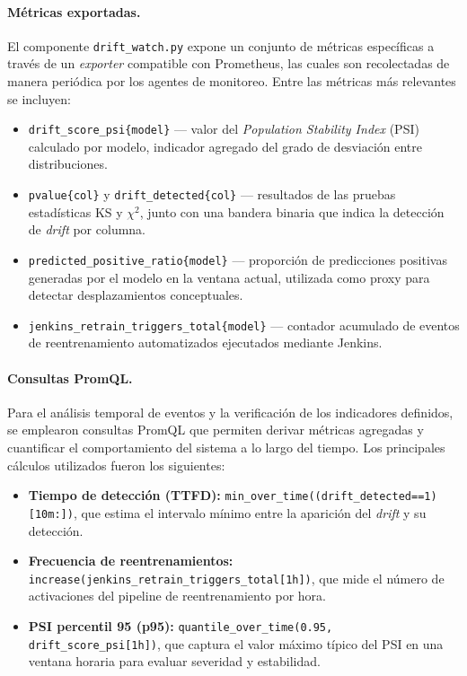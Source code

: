 \paragraph{Métricas exportadas.}
El componente \texttt{drift\_watch.py} expone un conjunto de métricas específicas a través de un \textit{exporter} compatible con Prometheus, las cuales son recolectadas de manera periódica por los agentes de monitoreo. Entre las métricas más relevantes se incluyen:
\begin{itemize}\setlength\itemsep{2pt}
  \item \texttt{drift\_score\_psi\{model\}} — valor del \textit{Population Stability Index} (PSI) calculado por modelo, indicador agregado del grado de desviación entre distribuciones.
  \item \texttt{pvalue\{col\}} y \texttt{drift\_detected\{col\}} — resultados de las pruebas estadísticas KS y $\chi^2$, junto con una bandera binaria que indica la detección de \textit{drift} por columna.
  \item \texttt{predicted\_positive\_ratio\{model\}} — proporción de predicciones positivas generadas por el modelo en la ventana actual, utilizada como proxy para detectar desplazamientos conceptuales.
  \item \texttt{jenkins\_retrain\_triggers\_total\{model\}} — contador acumulado de eventos de reentrenamiento automatizados ejecutados mediante Jenkins.
\end{itemize}

\paragraph{Consultas PromQL.}
Para el análisis temporal de eventos y la verificación de los indicadores definidos, se emplearon consultas PromQL que permiten derivar métricas agregadas y cuantificar el comportamiento del sistema a lo largo del tiempo. Los principales cálculos utilizados fueron los siguientes:
\begin{itemize}\setlength\itemsep{2pt}
  \item \textbf{Tiempo de detección (TTFD):} \texttt{min\_over\_time((drift\_detected==1)[10m:])}, que estima el intervalo mínimo entre la aparición del \textit{drift} y su detección.
  \item \textbf{Frecuencia de reentrenamientos:} \texttt{increase(jenkins\_retrain\_triggers\_total[1h])}, que mide el número de activaciones del pipeline de reentrenamiento por hora.
  \item \textbf{PSI percentil 95 (p95):} \texttt{quantile\_over\_time(0.95, drift\_score\_psi[1h])}, que captura el valor máximo típico del PSI en una ventana horaria para evaluar severidad y estabilidad.
\end{itemize}



